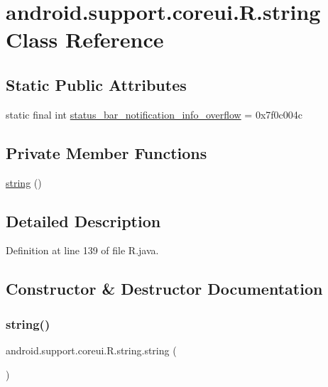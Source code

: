 \hypertarget{classandroid_1_1support_1_1coreui_1_1_r_1_1string}{}\section{android.\+support.\+coreui.\+R.\+string Class Reference}
\label{classandroid_1_1support_1_1coreui_1_1_r_1_1string}
\subsection*{Static Public Attributes}
\begin{DoxyCompactItemize}
\item 
static final int \mbox{\hyperlink{classandroid_1_1support_1_1coreui_1_1_r_1_1string_adcf4ea883d32357717589d816f0e05ce}{status\+\_\+bar\+\_\+notification\+\_\+info\+\_\+overflow}} = 0x7f0c004c
\end{DoxyCompactItemize}
\subsection*{Private Member Functions}
\begin{DoxyCompactItemize}
\item 
\mbox{\hyperlink{classandroid_1_1support_1_1coreui_1_1_r_1_1string_a9286c38aa0d71f26125c120351fb989d}{string}} ()
\end{DoxyCompactItemize}


\subsection{Detailed Description}


Definition at line 139 of file R.\+java.



\subsection{Constructor \& Destructor Documentation}
\mbox{\label{classandroid_1_1support_1_1coreui_1_1_r_1_1string_a9286c38aa0d71f26125c120351fb989d}} 
\subsubsection{\texorpdfstring{string()}{string()}}
{\footnotesize\ttfamily android.\+support.\+coreui.\+R.\+string.\+string (\begin{DoxyParamCaption}{ }\end{DoxyParamCaption})\hspace{0.3cm}{\ttfamily [private]}}




